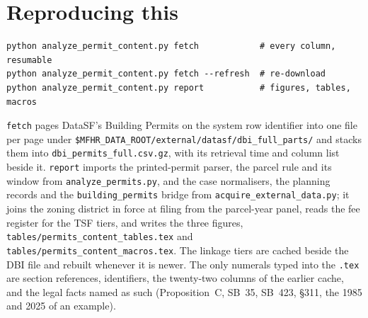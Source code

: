\documentclass[11pt]{article}
\begin{document}
\section{Reproducing this}

\begin{verbatim}
python analyze_permit_content.py fetch            # every column, resumable
python analyze_permit_content.py fetch --refresh  # re-download
python analyze_permit_content.py report           # figures, tables, macros
\end{verbatim}

\texttt{fetch} pages DataSF's Building Permits on the system row identifier into one file per
page under \texttt{\$MFHR\_DATA\_ROOT/external/datasf/dbi\_full\_parts/} and stacks them into
\texttt{dbi\_permits\_full.csv.gz}, with its retrieval time and column list beside it.
\texttt{report} imports the printed-permit parser, the parcel rule and its window from
\texttt{analyze\_permits.py}, and the case normalisers, the planning records and the
\texttt{building\_permits} bridge from \texttt{acquire\_external\_data.py}; it joins the zoning
district in force at filing from the parcel-year panel, reads the fee register for the TSF
tiers, and writes the three figures, \texttt{tables/permits\_content\_tables.tex} and
\texttt{tables/permits\_content\_macros.tex}. The linkage tiers are cached beside the DBI file
and rebuilt whenever it is newer. The only numerals typed into the \texttt{.tex} are section
references, identifiers, the twenty-two columns of the earlier cache, and the legal facts named
as such (Proposition~C, SB~35, SB~423, \S311, the 1985 and 2025 of an example).
\end{document}
